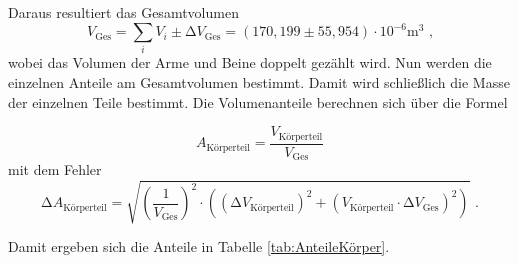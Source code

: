Daraus resultiert das Gesamtvolumen
\begin{equation*}
  V_{\text{Ges}} = \sum_i V_{i} \pm  \increment V_{\text{Ges}}= (170,199 \pm 55,954) \cdot 10^{-6} \unit{\cubic\meter} \text{ ,}
\end{equation*}
wobei das Volumen der Arme und Beine doppelt gezählt wird.
Nun werden die einzelnen Anteile am Gesamtvolumen bestimmt.
Damit wird schließlich die Masse der einzelnen Teile bestimmt.
Die Volumenanteile berechnen sich über die Formel


\begin{equation*}
  A_{\text{Körperteil}} = \frac {V_{\text{Körperteil}}} {V_{\text{Ges}}}
\end{equation*}
mit dem Fehler
\begin{equation*}
  \increment A_{\text{Körperteil}} = \sqrt{\left(\frac{1}{V_{\text{Ges}}}\right)^2 
  \cdot \left(\left( \increment V_{\text{Körperteil}} \right)^2 + \left( V_{\text{Körperteil}} 
  \cdot \increment V_{\text{Ges}} \right)^2\right)} \text{ .}
\end{equation*}

Damit ergeben sich die Anteile in Tabelle \ref{tab:AnteileKörper}.



